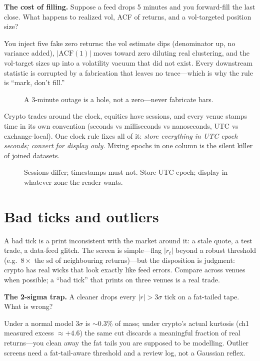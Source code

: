 \begin{example}\label{ex:gapfill}
\textbf{The cost of filling.} Suppose a feed drops 5 minutes and you forward-fill the last
close. What happens to realized vol, ACF of returns, and a vol-targeted position size?
\begin{solution}
You inject five fake zero returns: the vol estimate dips (denominator up, no variance added),
$|\mathrm{ACF}(1)|$ moves toward zero diluting real clustering, and the vol-target sizes up
into a volatility vacuum that did not exist. Every downstream statistic is corrupted by a
fabrication that leaves no trace---which is why the rule is ``mark, don't fill.''
\end{solution}
\end{example}

\begin{figure}[htbp]\centering

\caption{A 3-minute outage is a hole, not a zero---never fabricate bars.}
\label{fig:gap}
\end{figure}

Crypto trades around the clock, equities have sessions, and every venue stamps time in its
own convention (seconds vs milliseconds vs nanoseconds, UTC vs exchange-local). One clock
rule fixes all of it: \emph{store everything in UTC epoch seconds; convert for display only.}
Mixing epochs in one column is the silent killer of joined datasets.

\begin{figure}[htbp]\centering

\caption{Sessions differ; timestamps must not. Store UTC epoch; display in whatever zone the
reader wants.}
\label{fig:tz}
\end{figure}

\section{Bad ticks and outliers}\label{sec:outliers}

A bad tick is a print inconsistent with the market around it: a stale quote, a test trade, a
data-feed glitch. The screen is simple---flag $|r_t|$ beyond a robust threshold (e.g.\
$8\times$ the sd of neighbouring returns)---but the disposition is judgment: crypto has real
wicks that look exactly like feed errors. Compare across venues when possible; a ``bad tick''
that prints on three venues is a real trade.

\begin{example}\label{ex:outlier}
\textbf{The 2-sigma trap.} A cleaner drops every $|r|>3\sigma$ tick on a fat-tailed tape.
What is wrong?
\begin{solution}
Under a normal model $3\sigma$ is $\sim$0.3\% of mass; under crypto's actual kurtosis
(ch1 measured excess $\approx+4.6$) the same cut discards a meaningful fraction of real
returns---you clean away the fat tails you are supposed to be modelling. Outlier screens need
a fat-tail-aware threshold and a review log, not a Gaussian reflex.
\end{solution}
\end{example}

